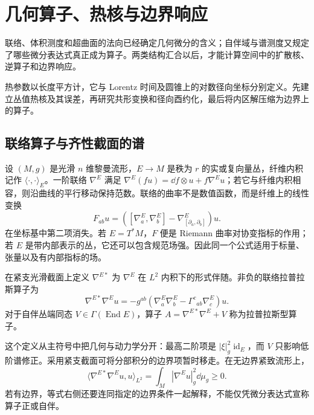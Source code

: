 \chapter{几何算子、热核与边界响应}
\label{chap:ghs-math-geometric-operators}
\label{chap:ghs-conformal-radial-geometry}
\label{chap:ghs-general-conformal-geometry}

联络、体积测度和超曲面的法向已经确定几何微分的含义；自伴域与谱测度又规定了哪些微分表达式真正成为算子。两类结构汇合以后，才能计算空间中的扩散核、逆算子和边界响应。

热参数以长度平方计，它与 Lorentz 时间及圆锥上的对数径向坐标分别定义。先建立丛值热核及其误差，再研究共形变换和径向酉约化，最后将内区解压缩为边界上的算子。

\section{联络算子与齐性截面的谱}

设 $(M,g)$ 是光滑 $n$ 维黎曼流形，$E\to M$ 是秩为 $r$ 的实或复向量丛，纤维内积记作 $\langle\cdot,\cdot\rangle_E$。一阶联络 $\nabla^E$ 满足 $\nabla^E(fu)=\dd f\otimes u+f\nabla^Eu$；若它与纤维内积相容，则沿曲线的平行移动保持范数。联络的曲率不是数值函数，而是纤维上的线性变换
\begin{equation}\label{eq:ghs-r6-bundle-curvature}
F_{ab}u=([\nabla^E_a,\nabla^E_b]-\nabla^E_{[\partial_a,\partial_b]})u.
\end{equation}
在坐标基中第二项消失。若 $E=T^*M$，$F$ 便是 Riemann 曲率对协变指标的作用；若 $E$ 是带内部表示的丛，它还可以包含规范场强。因此同一个公式适用于标量、张量以及有内部指标的场。

\begin{definition}[联络拉普拉斯算子]
在紧支光滑截面上定义 $\nabla^{E*}$ 为 $\nabla^E$ 在 $L^2$ 内积下的形式伴随。非负的联络拉普拉斯算子为
\begin{equation}\label{eq:ghs-r6-bochner-laplacian}
\nabla^{E*}\nabla^Eu=-g^{ab}(\nabla^E_a\nabla^E_b-\Gamma^c{}_{ab}\nabla^E_c)u.
\end{equation}
对于自伴丛端同态 $V\in\Gamma(\operatorname{End}E)$，算子 $A=\nabla^{E*}\nabla^E+V$ 称为拉普拉斯型算子。
\end{definition}

这个定义从主符号中把几何与动力学分开：最高二阶项是 $|\xi|_g^2\operatorname{id}_E$，而 $V$ 只影响低阶谱修正。采用紧支截面可将分部积分的边界项暂时移走。在无边界紧致流形上，
\[
\langle\nabla^{E*}\nabla^Eu, u\rangle_{L^2}
 =\int_M|\nabla^Eu|_g^2\dd\mu_g\ge0.
\]
若有边界，等式右侧还要连同指定的边界条件一起解释，不能仅凭微分表达式宣称算子正或自伴。


